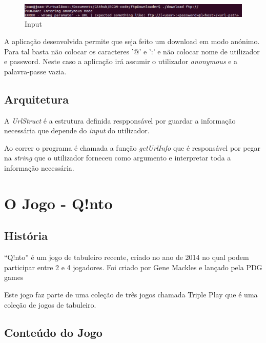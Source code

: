 \documentclass[a4paper]{article}
\begin{document}
	\begin{figure}[H]
  	\includegraphics[width=\linewidth]{consoleScreenshot1.png}
  	\caption{Input}
  	\label{fig:input}
	\end{figure}

	A aplicação desenvolvida permite que seja feito um download em modo anónimo. Para tal basta não colocar os caracteres '@' e ':' e não colocar nome de utilizador e password. Neste caso a aplicação irá assumir o utilizador \textit{anonymous} e a palavra-passe vazia.

	\subsection{Arquitetura}

	A \textit{UrlStruct} é a estrutura definida respponsável por guardar a informação necessária que depende do \textit{input} do utilizador.

	
	\normalsize

	Ao correr o programa é chamada a função \textit{getUrlInfo} que é responsável por pegar na \textit{string} que o utilizador forneceu como argumento e interpretar toda a informação necessária.

	
	\normalsize

	\newpage

	\section{O Jogo - Q!nto}
	\subsection{História}
	
	“Q!nto” é um jogo de tabuleiro recente, criado no ano de 2014 no qual podem participar entre 2 e 4 jogadores. Foi criado por Gene Mackles e lançado pela PDG games
	
	Este jogo faz parte de uma coleção de três jogos chamada Triple Play que é uma coleção de jogos de tabuleiro.

	\subsection{Conteúdo do Jogo}
	
\end{document}
